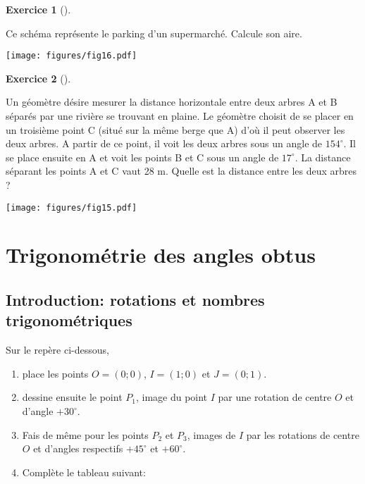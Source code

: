 \documentclass[
  a4paper,
  DIV=11,
  numbers=noendperiod,
  oneside]{scrreprt}
\theoremstyle{definition}
\theoremstyle{definition}
\newtheorem{exercise}{Exercice}[chapter]
\theoremstyle{plain}
\theoremstyle{definition}
\theoremstyle{remark}
\begin{document}
\begin{exercise}[]\protect\hypertarget{exr-}{}\label{exr-}

Ce schéma représente le parking d'un supermarché. Calcule son aire.

\begin{center}
\texttt{[image: figures/fig16.pdf]}
\end{center}

\end{exercise}

\begin{exercise}[]\protect\hypertarget{exr-}{}\label{exr-}

Un géomètre désire mesurer la distance horizontale entre deux arbres A
et B séparés par une rivière se trouvant en plaine. Le géomètre choisit
de se placer en un troisième point C (situé sur la même berge que A)
d'où il peut observer les deux arbres. A partir de ce point, il voit les
deux arbres sous un angle de \(154^\circ\). Il se place ensuite en A et
voit les points B et C sous un angle de \(17^\circ\). La distance
séparant les points A et C vaut 28 m. Quelle est la distance entre les
deux arbres ?

\begin{center}
\texttt{[image: figures/fig15.pdf]}
\end{center}

\end{exercise}


\chapter{Trigonométrie des angles
obtus}\label{trigonomuxe9trie-des-angles-obtus}

\section{Introduction: rotations et nombres
trigonométriques}\label{introduction-rotations-et-nombres-trigonomuxe9triques}

Sur le repère ci-dessous,

\begin{enumerate}
\def\labelenumi{\arabic{enumi})}
\item
  place les points \(O=(0;0)\), \(I=(1;0)\) et \(J=(0;1)\).
\item
  dessine ensuite le point \(P_1\), image du point \(I\) par une
  rotation de centre \(O\) et d'angle \(+30^\circ\).
\item
  Fais de même pour les points \(P_2\) et \(P_3\), images de \(I\) par
  les rotations de centre \(O\) et d'angles respectifs \(+45^\circ\) et
  \(+60^\circ\).
\item
  Complète le tableau suivant:
\end{enumerate}
\end{document}
